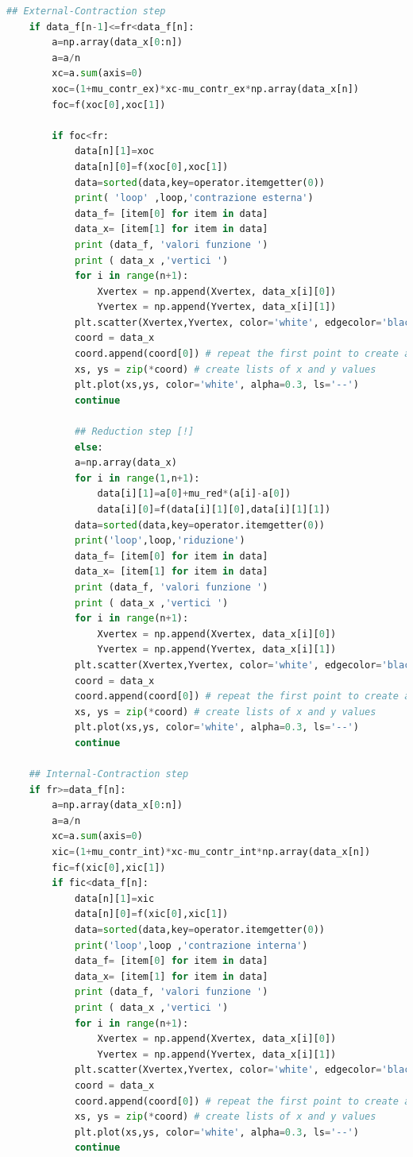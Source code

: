 \begin{lstlisting}[language=python, style=Pystyle, caption=\texttt{Python} code for Simplex Minimization Routine, label=list:Simplex, 	captionpos=b]
	## External-Contraction step
	if data_f[n-1]<=fr<data_f[n]:  
		a=np.array(data_x[0:n])
		a=a/n
		xc=a.sum(axis=0)
		xoc=(1+mu_contr_ex)*xc-mu_contr_ex*np.array(data_x[n])
		foc=f(xoc[0],xoc[1])
		
		if foc<fr:
			data[n][1]=xoc
			data[n][0]=f(xoc[0],xoc[1])
			data=sorted(data,key=operator.itemgetter(0)) 
			print( 'loop' ,loop,'contrazione esterna')
			data_f= [item[0] for item in data]
			data_x= [item[1] for item in data]
			print (data_f, 'valori funzione ')
			print ( data_x ,'vertici ')
			for i in range(n+1):
				Xvertex = np.append(Xvertex, data_x[i][0])
				Yvertex = np.append(Yvertex, data_x[i][1])
			plt.scatter(Xvertex,Yvertex, color='white', edgecolor='black')
			coord = data_x
			coord.append(coord[0]) # repeat the first point to create a 'closed loop'
			xs, ys = zip(*coord) # create lists of x and y values
			plt.plot(xs,ys, color='white', alpha=0.3, ls='--') 
			continue
		
			## Reduction step [!]
			else: 
			a=np.array(data_x)
			for i in range(1,n+1):
				data[i][1]=a[0]+mu_red*(a[i]-a[0])
				data[i][0]=f(data[i][1][0],data[i][1][1])
			data=sorted(data,key=operator.itemgetter(0)) 
			print('loop',loop,'riduzione')
			data_f= [item[0] for item in data]
			data_x= [item[1] for item in data]
			print (data_f, 'valori funzione ')
			print ( data_x ,'vertici ')
			for i in range(n+1):
				Xvertex = np.append(Xvertex, data_x[i][0])
				Yvertex = np.append(Yvertex, data_x[i][1])
			plt.scatter(Xvertex,Yvertex, color='white', edgecolor='black')
			coord = data_x
			coord.append(coord[0]) # repeat the first point to create a 'closed loop'
			xs, ys = zip(*coord) # create lists of x and y values
			plt.plot(xs,ys, color='white', alpha=0.3, ls='--') 
			continue
	
	## Internal-Contraction step
	if fr>=data_f[n]:  
		a=np.array(data_x[0:n])
		a=a/n
		xc=a.sum(axis=0)
		xic=(1+mu_contr_int)*xc-mu_contr_int*np.array(data_x[n])
		fic=f(xic[0],xic[1])
		if fic<data_f[n]: 
			data[n][1]=xic
			data[n][0]=f(xic[0],xic[1])
			data=sorted(data,key=operator.itemgetter(0)) 
			print('loop',loop ,'contrazione interna') 
			data_f= [item[0] for item in data]
			data_x= [item[1] for item in data]
			print (data_f, 'valori funzione ')
			print ( data_x ,'vertici ')
			for i in range(n+1):
				Xvertex = np.append(Xvertex, data_x[i][0])
				Yvertex = np.append(Yvertex, data_x[i][1])
			plt.scatter(Xvertex,Yvertex, color='white', edgecolor='black')
			coord = data_x
			coord.append(coord[0]) # repeat the first point to create a 'closed loop'
			xs, ys = zip(*coord) # create lists of x and y values
			plt.plot(xs,ys, color='white', alpha=0.3, ls='--') 
			continue 
		

\end{lstlisting}
